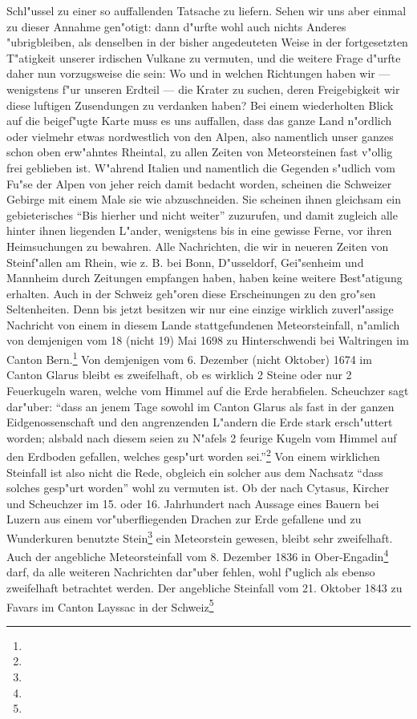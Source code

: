 \documentclass[a4paper, 8pt, oneside, polutonikogreek, german]{article}
\begin{document}
Schl"ussel zu einer so auffallenden Tatsache zu liefern. Sehen wir uns aber einmal zu dieser Annahme gen"otigt: dann d"urfte wohl auch nichts Anderes "ubrigbleiben, als denselben in der bisher angedeuteten Weise in der fortgesetzten T"atigkeit unserer irdischen Vulkane zu vermuten, und die weitere Frage d"urfte daher nun vorzugsweise die sein: Wo und in welchen Richtungen haben wir --- wenigstens f"ur unseren Erdteil --- die Krater zu suchen, deren Freigebigkeit wir diese luftigen Zusendungen zu verdanken haben? Bei einem wiederholten Blick auf die beigef"ugte Karte muss es uns auffallen, dass das ganze Land n"ordlich oder vielmehr etwas nordwestlich von den Alpen, also namentlich unser ganzes schon oben erw"ahntes Rheintal, zu allen Zeiten von Meteorsteinen fast v"ollig frei geblieben ist. W"ahrend Italien und namentlich die Gegenden s"udlich vom Fu"se der Alpen von jeher reich damit bedacht worden, scheinen die Schweizer Gebirge mit einem Male sie wie abzuschneiden. Sie scheinen ihnen gleichsam ein gebieterisches "`Bis hierher und nicht weiter"' zuzurufen, und damit zugleich alle hinter ihnen liegenden L"ander, wenigstens bis in eine gewisse Ferne, vor ihren Heimsuchungen zu bewahren. Alle Nachrichten, die wir in neueren Zeiten von Steinf"allen am Rhein, wie z. B. bei Bonn, D"usseldorf, Gei"senheim und Mannheim durch Zeitungen empfangen haben, haben keine weitere Best"atigung erhalten. Auch in der Schweiz geh"oren diese Erscheinungen zu den gro"sen Seltenheiten. Denn bis jetzt besitzen wir nur eine einzige wirklich zuverl"assige Nachricht von einem in diesem Lande stattgefundenen Meteorsteinfall, n"amlich von demjenigen vom 18 (nicht 19) Mai 1698 zu Hinterschwendi bei Waltringen im Canton Bern.\footnote{} Von demjenigen vom 6. Dezember (nicht Oktober) 1674 im Canton Glarus bleibt es zweifelhaft, ob es wirklich 2 Steine oder nur 2 Feuerkugeln waren, welche vom Himmel auf die Erde herabfielen. Scheuchzer sagt dar"uber: "`dass an jenem Tage sowohl im Canton Glarus als fast in der ganzen Eidgenossenschaft und den angrenzenden L"andern die Erde stark ersch"uttert worden; alsbald nach diesem seien zu N"afels 2 feurige Kugeln vom Himmel auf den Erdboden gefallen, welches gesp"urt worden sei."'\footnote{} Von einem wirklichen Steinfall ist also nicht die Rede, obgleich ein solcher aus dem Nachsatz "`dass solches gesp"urt worden"' wohl zu vermuten ist. Ob der nach Cytasus, Kircher und Scheuchzer im 15. oder 16. Jahrhundert nach Aussage eines Bauern bei Luzern aus einem vor"uberfliegenden Drachen zur Erde gefallene und zu Wunderkuren benutzte Stein\footnote{} ein Meteorstein gewesen, bleibt sehr zweifelhaft. Auch der angebliche Meteorsteinfall vom 8. Dezember 1836 in Ober-Engadin\footnote{} darf, da alle weiteren Nachrichten dar"uber fehlen, wohl f"uglich als ebenso zweifelhaft betrachtet werden. Der angebliche Steinfall vom 21. Oktober 1843 zu Favars im Canton Layssac in der Schweiz\footnote{} 
\end{document}
